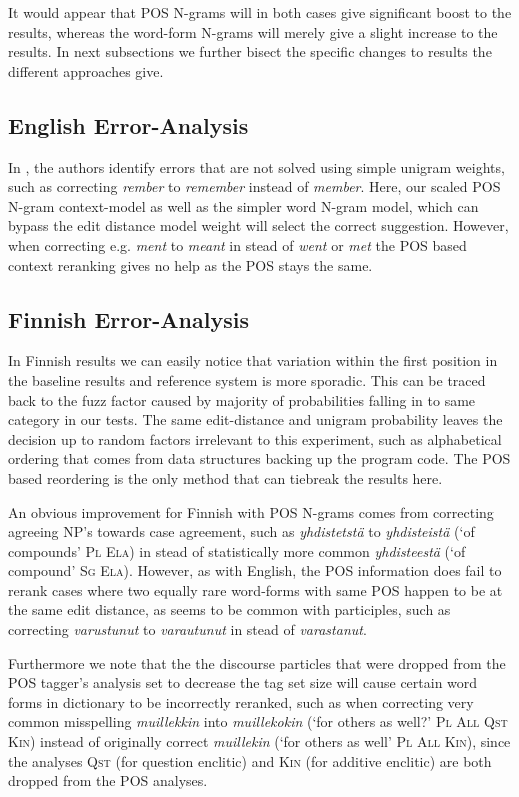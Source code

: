 \documentclass{llncs}
\begin{document}
It would appear that POS N-grams will in both cases give significant boost to
the results, whereas the word-form N-grams will merely give a slight increase to
the results. In next subsections we further bisect the specific changes to
results the different approaches give.

\subsection{English Error-Analysis}

In \cite{norvig/2010}, the authors identify errors that are not solved using
simple unigram weights, such as correcting \emph{rember} to \emph{remember}
instead of \emph{member}. Here, our scaled POS N-gram context-model as well
as the simpler word N-gram model, which can bypass the
edit distance model weight will select the correct suggestion. However, when
correcting e.g.  \emph{ment} to \emph{meant} in stead of \emph{went} or
\emph{met} the POS based context reranking gives no help as the POS stays the
same.
 
\subsection{Finnish Error-Analysis}

In Finnish results we can easily notice that variation within the first
position in the baseline results and reference system is more sporadic. This
can be traced back to the fuzz factor caused by majority of probabilities
falling in to same category in our tests. The same edit-distance and unigram
probability leaves the decision up to random factors irrelevant to this
experiment, such as alphabetical ordering that comes from data structures
backing up the program code. The POS based reordering is the only method that
can tiebreak the results here.

An obvious improvement for Finnish with POS N-grams comes from correcting
agreeing NP's towards case agreement, such as \emph{yhdistetstä} to
\emph{yhdisteistä} (`of compounds' \textsc{Pl Ela}) in stead of statistically
more common \emph{yhdisteestä} (`of compound' \textsc{Sg Ela}). However, as
with English, the POS information does fail to rerank cases where two equally
rare word-forms with same POS happen to be at the same edit distance, as seems
to be common with participles, such as correcting \emph{varustunut} to
\emph{varautunut} in stead of \emph{varastanut}.

Furthermore we note that the the discourse particles that were dropped from the
POS tagger's analysis set to decrease the tag set size will cause certain word
forms in dictionary to be incorrectly reranked, such as when correcting very
common misspelling \emph{muillekkin} into \emph{muillekokin} (`for others as
well?' \textsc{Pl All Qst Kin}) instead of originally correct \emph{muillekin}
(`for others as well' \textsc{Pl All Kin}), since the analyses \textsc{Qst}
(for question enclitic) and \textsc{Kin} (for additive enclitic) are both
dropped from the POS analyses.
\end{document}
